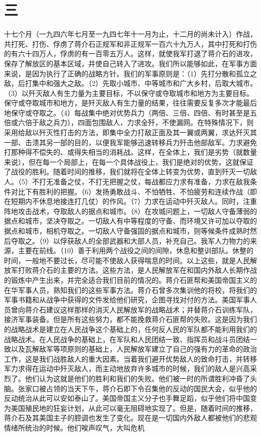 \section*{三}

十七个月（一九四六年七月至一九四七年十一月为止，十二月的尚未计入）作战，共打死、打伤、俘虏了蒋介石正规军和非正规军一百六十九万人，其中打死和打伤的有六十四万人，俘虏的有一百零五万人。这样，就使我军打退了蒋介石的进攻，保存了解放区的基本区域，并使自己转入了进攻。我们所以能够如此，在军事方面来说，是因为执行了正确的战略方针。我们的军事原则是：（1）先打分散和孤立之敌，后打集中和强大之敌。（2）先取小城市、中等城市和广大乡村，后取大城市。（3）以歼灭敌人有生力量为主要目标，不以保守或夺取城市和地方为主要目标。保守或夺取城市和地方，是歼灭敌人有生力量的结果，往往需要反复多次才能最后地保守或夺取之。（4）每战集中绝对优势兵力（两倍、三倍、四倍、有时甚至是五倍或六倍于敌之兵力），四面包围敌人，力求全歼，不使漏网。在特殊情况下，则采用给敌以歼灭性打击的方法，即集中全力打敌正面及其一翼或两翼，求达歼灭其一部、击溃其另一部的目的，以便我军能够迅速转移兵力歼击他部敌军。力求避免打那种得不偿失的、或得失相当的消耗战。这样，在全体上，我们是劣势（就数量来说），但在每一个局部上，在每一个具体战役上，我们是绝对的优势，这就保证了战役的胜利。随着时间的推移，我们就将在全体上转变为优势，直到歼灭一切敌人。（5）不打无准备之仗，不打无把握之仗，每战都应力求有准备，力求在敌我条件对比下有胜利的把握。（6）发扬勇敢战斗、不怕牺牲、不怕疲劳和连续作战（即在短期内不休息地接连打几仗）的作风。（7）力求在运动中歼灭敌人。同时，注重阵地攻击战术，夺取敌人的据点和城市。（8）在攻城问题上，一切敌人守备薄弱的据点和城市，坚决夺取之。一切敌人有中等程度的守备、而环境又许可加以夺取的据点和城市，相机夺取之。一切敌人守备强固的据点和城市，则等候条件成熟时然后夺取之。（9）以俘获敌人的全部武器和大部人员，补充自己。我军人力物力的来源，主要在前线。（10）善于利用两个战役之间的间隙，休息和整训部队。休整的时间，一般地不要过长，尽可能不使敌人获得喘息的时间。以上这些，就是人民解放军打败蒋介石的主要的方法。这些方法，是人民解放军在和国内外敌人长期作战的锻炼中产生出来，并完全适合我们目前的情况的。蒋介石匪帮和美国帝国主义的在华军事人员，熟知我们的这些军事方法。蒋介石曾多次集训他的将校，将我们的军事书籍和从战争中获得的文件发给他们研究，企图寻找对付的方法。美国军事人员曾向蒋介石建议这样那样的消灭人民解放军的战略战术；并替蒋介石训练军队，接济军事装备。但是所有这些努力，都不能挽救蒋介石匪帮的失败。这是因为我们的战略战术是建立在人民战争这个基础上的，任何反人民的军队都不能利用我们的战略战术。在人民战争的基础上，在军队和人民团结一致、指挥员和战斗员团结一致以及瓦解敌军等项原则的基础上，人民解放军建立了自己的强有力的革命的政治工作，这是我们战胜敌人的重大因素。当着我们避开优势敌人的致命打击，并转移军力求得在运动中歼灭敌人，而主动地放弃许多城市的时候，我们的敌人是兴高采烈了。他们认为这就是他们的胜利和我们的失败。他们被一时的所谓胜利冲昏了头脑。张家口被占领的当天下午，蒋介石即下令召集他的反动的国民大会，似乎他的反动统治从此可以安如泰山了。美国帝国主义分子也手舞足蹈，似乎他们将中国变为美国殖民地的狂妄计划，从此可以毫无阻碍地实现了。但是，随着时间的推移，蒋介石及其美国主子的腔调也发生了变化。现在是一切国内外敌人都被他们的悲观情绪所统治的时候。他们唉声叹气，大叫危机